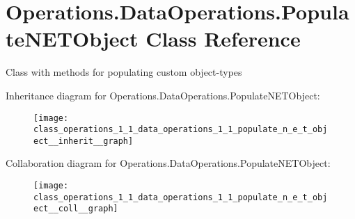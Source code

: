 \hypertarget{class_operations_1_1_data_operations_1_1_populate_n_e_t_object}{}\section{Operations.\+Data\+Operations.\+Populate\+N\+E\+T\+Object Class Reference}
\label{class_operations_1_1_data_operations_1_1_populate_n_e_t_object}


Class with methods for populating custom object-\/types  




Inheritance diagram for Operations.\+Data\+Operations.\+Populate\+N\+E\+T\+Object\+:
\nopagebreak
\begin{figure}[H]
\begin{center}
\leavevmode
\texttt{[image: class\_operations\_1\_1\_data\_operations\_1\_1\_populate\_n\_e\_t\_object\_\_inherit\_\_graph]}
\end{center}
\end{figure}


Collaboration diagram for Operations.\+Data\+Operations.\+Populate\+N\+E\+T\+Object\+:
\nopagebreak
\begin{figure}[H]
\begin{center}
\leavevmode
\texttt{[image: class\_operations\_1\_1\_data\_operations\_1\_1\_populate\_n\_e\_t\_object\_\_coll\_\_graph]}
\end{center}
\end{figure}
